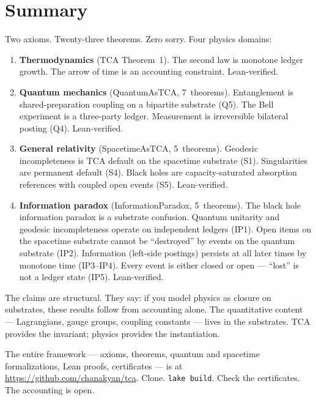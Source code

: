 \documentclass[11pt]{article}
\begin{document}
\section{Summary}

Two axioms.  Twenty-three theorems.  Zero sorry.  Four physics domains:

\begin{enumerate}[leftmargin=2em]
\item \textbf{Thermodynamics} (TCA Theorem~1).  The second law is
  monotone ledger growth.  The arrow of time is an accounting
  constraint.  Lean-verified.

\item \textbf{Quantum mechanics} (QuantumAsTCA, 7~theorems).
  Entanglement is shared-preparation coupling on a bipartite
  substrate (Q5).  The Bell experiment is a three-party ledger.
  Measurement is irreversible bilateral posting (Q4).  Lean-verified.

\item \textbf{General relativity} (SpacetimeAsTCA, 5~theorems).
  Geodesic incompleteness is TCA default on the spacetime substrate
  (S1).  Singularities are permanent default (S4).  Black holes are
  capacity-saturated absorption references with coupled open events
  (S5).  Lean-verified.

\item \textbf{Information paradox} (InformationParadox, 5~theorems).
  The black hole information paradox is a substrate confusion.
  Quantum unitarity and geodesic incompleteness operate on independent
  ledgers (IP1).  Open items on the spacetime substrate cannot be
  ``destroyed'' by events on the quantum substrate (IP2).  Information
  (left-side postings) persists at all later times by monotone time
  (IP3--IP4).  Every event is either closed or open --- ``lost'' is
  not a ledger state (IP5).  Lean-verified.
\end{enumerate}

The claims are structural.  They say: if you model physics as closure
on substrates, these results follow from accounting alone.  The
quantitative content --- Lagrangians, gauge groups, coupling
constants --- lives in the substrates.  TCA provides the invariant;
physics provides the instantiation.

The entire framework --- axioms, theorems, quantum and spacetime
formalizations, Lean proofs, certificates --- is at
\url{https://github.com/chanakyan/tca}.  Clone.  \texttt{lake build}.
Check the certificates.  The accounting is open.
\end{document}
